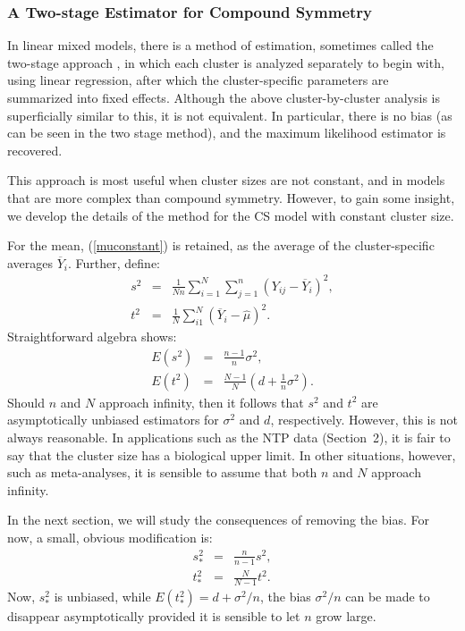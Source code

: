 \documentclass[11pt,a5paper,twoside]{book}
\begin{document}
{\subsubsection{A Two-stage Estimator for Compound Symmetry}

In linear mixed models, there is a method of estimation, sometimes called 
the two-stage approach \citep{laird1982random,Molenberghs2000}, in which each cluster is 
analyzed separately to begin with, using linear regression, after 
which the cluster-specific parameters are summarized into fixed effects. 
Although the above cluster-by-cluster analysis is superficially similar to this,
it is not equivalent. In particular, there is no bias (as can be seen in 
the two stage method), and the maximum likelihood estimator is recovered. 

This approach is most useful when cluster sizes are not constant, 
and in models that are more complex than compound symmetry. However, 
to gain some insight, we develop the details of the method for the CS model 
with constant cluster size.

For the mean, (\ref{muconstant}) is retained, as the average of the 
cluster-specific averages $\overline{Y}_i$. Further, define:
\begin{eqnarray}
\label{twostages1}
s^2&=&\frac{1}{Nn}\sum_{i=1}^N\sum_{j=1}^n(Y_{ij}-\overline{Y}_i)^2,\\
t^2&=&\frac{1}{N}\sum_{i1}^N(\overline{Y}_i-\widehat{\mu})^2.
\label{twostaget1}
\end{eqnarray}
Straightforward algebra shows:
\begin{eqnarray}
\label{exps1}
E(s^2)&=&\frac{n-1}{n}\sigma^2,\\
\label{expt1}
E(t^2)&=&\frac{N-1}{N}\left(d+\frac{1}{n}\sigma^2\right).
\end{eqnarray}
Should $n$ and $N$ approach infinity, then it follows that $s^2$ and $t^2$ 
are asymptotically unbiased estimators for $\sigma^2$ and $d$, 
respectively. However, this is not always reasonable. In applications 
such as the NTP data (Section~2),
it is fair to say that 
the cluster size has a biological upper limit. In other situations, 
however, such as meta-analyses, it is sensible to assume that both 
$n$ and $N$ approach infinity.

In the next section, we will study the consequences of removing the bias. 
For now, a small, obvious modification is:
\begin{eqnarray}
\label{twostages2}
s^2_\ast&=&\frac{n}{n-1}s^2,\\
t^2_\ast&=&\frac{N}{N-1}t^2.
\label{twostaget2}
\end{eqnarray}
Now, $s^2_\ast$ is unbiased, while $E(t^2_\ast)=d+\sigma^2/n$, 
the bias $\sigma^2/n$ can be made to disappear asymptotically 
provided it is sensible to let $n$ grow large.

}
\end{document}
